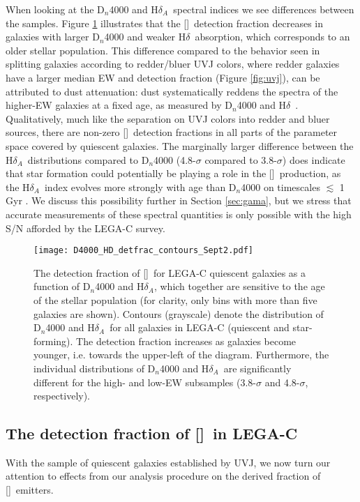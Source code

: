 \documentclass[twocolumn,natbib,iop,hyperref]{aastex62}
\newcommand{\oii}{[\ion{O}{2}]}
\newcommand{\hd}{H$\delta$}
\newcommand{\hda}{H$\delta_{A}$}
\begin{document}
When looking at the D$_n$4000 and \hda\ spectral indices we see differences between the samples.  Figure \ref{fig:d4000} illustrates that the \oii\ detection fraction decreases in galaxies with larger D$_n$4000 and weaker \hd\ absorption, which corresponds to an older stellar population.  This difference compared to the behavior seen in splitting galaxies according to redder/bluer UVJ colors, where redder galaxies have a larger median EW and detection fraction (Figure \ref{fig:uvj}), can be attributed to dust attenuation: dust systematically reddens the spectra of the higher-EW galaxies at a fixed age, as measured by D$_n$4000 and \hd\ \cite[see also][]{2018MNRAS.481.1774H}.  Qualitatively, much like the separation on UVJ colors into redder and bluer sources, there are non-zero \oii\ detection fractions in all parts of the parameter space covered by quiescent galaxies.  The marginally larger difference between the \hda\ distributions compared to D$_n$4000 (4.8-$\sigma$ compared to 3.8-$\sigma$) does indicate that star formation could potentially be playing a role in the \oii\ production, as the \hda\ index evolves more strongly with age than D$_n$4000 on timescales $\lesssim$ 1 Gyr \citep{2003MNRAS.341...33K}.  We discuss this possibility further in Section \ref{sec:gama}, but we stress that accurate measurements of these spectral quantities is only possible with the high S/N afforded by the LEGA-C survey.

\begin{figure}
\begin{center}
\texttt{[image: D4000\_HD\_detfrac\_contours\_Sept2.pdf]} %
\caption{The detection fraction of \oii\ for LEGA-C quiescent galaxies as a function of D$_n$4000 and \hda, which together are sensitive to the age of the stellar population (for clarity, only bins with more than five galaxies are shown).  Contours (grayscale) denote the distribution of D$_n$4000 and \hda\ for all galaxies in LEGA-C (quiescent and star-forming).  The detection fraction increases as galaxies become younger, i.e. towards the upper-left of the diagram.  Furthermore, the individual distributions of D$_n$4000 and \hda\ are significantly different for the high- and low-EW subsamples (3.8-$\sigma$ and 4.8-$\sigma$, respectively).}
\label{fig:d4000}
\end{center}
\end{figure}



\subsection{The detection fraction of \oii\ in LEGA-C}
With the sample of quiescent galaxies established by UVJ, we now turn our attention to effects from our analysis procedure on the derived fraction of \oii\ emitters.
\end{document}
